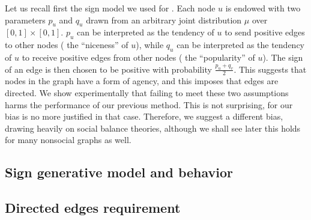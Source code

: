 Let us recall first the sign model we used for \dssn{}. Each node $u$ is endowed with two parameters
$p_u$ and $q_u$ drawn from an arbitrary joint distribution $\mu$ over $[0,1]\times [0,1]$. $p_u$ can be
interpreted as the tendency of $u$ to send positive edges to other nodes (\ie{} the
\enquote{niceness} of $u$), while $q_u$ can be interpreted as the tendency of $u$ to receive positive
edges from other nodes (\ie{} the \enquote{popularity} of $u$). The sign of an edge \euv{} is then
chosen to be positive with probability $\frac{p_u+q_v}{2}$. This suggests that nodes in the
graph have a form of agency, and this imposes that edges are directed. We show experimentally that
failing to meet these two assumptions harms the performance of our previous method. This is not
surprising, for our bias is no more justified in that case. Therefore, we suggest a different bias,
drawing heavily on social balance theories, although we shall see later this holds for many
nonsocial graphs as well.

\subsection{Sign generative model and behavior}
\label{sub:bias_sign_behavior}



\subsection{Directed edges requirement}
\label{sub:need_for_a_directed_graph}


